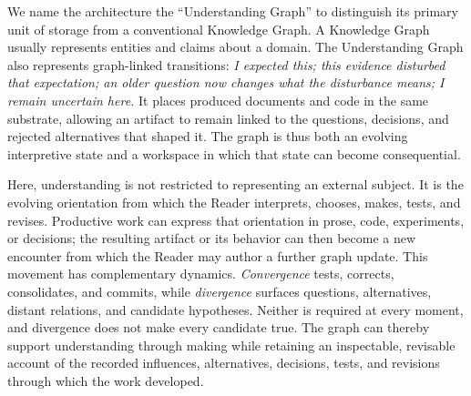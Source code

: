 We name the architecture the ``Understanding Graph'' to distinguish its primary unit of storage from a conventional Knowledge Graph. A Knowledge Graph usually represents entities and claims about a domain. The Understanding Graph also represents graph-linked transitions: \emph{I expected this; this evidence disturbed that expectation; an older question now changes what the disturbance means; I remain uncertain here.} It places produced documents and code in the same substrate, allowing an artifact to remain linked to the questions, decisions, and rejected alternatives that shaped it. The graph is thus both an evolving interpretive state and a workspace in which that state can become consequential.

Here, understanding is not restricted to representing an external subject. It is the evolving orientation from which the Reader interprets, chooses, makes, tests, and revises. Productive work can express that orientation in prose, code, experiments, or decisions; the resulting artifact or its behavior can then become a new encounter from which the Reader may author a further graph update. This movement has complementary dynamics. \emph{Convergence} tests, corrects, consolidates, and commits, while \emph{divergence} surfaces questions, alternatives, distant relations, and candidate hypotheses. Neither is required at every moment, and divergence does not make every candidate true. The graph can thereby support understanding through making while retaining an inspectable, revisable account of the recorded influences, alternatives, decisions, tests, and revisions through which the work developed.

